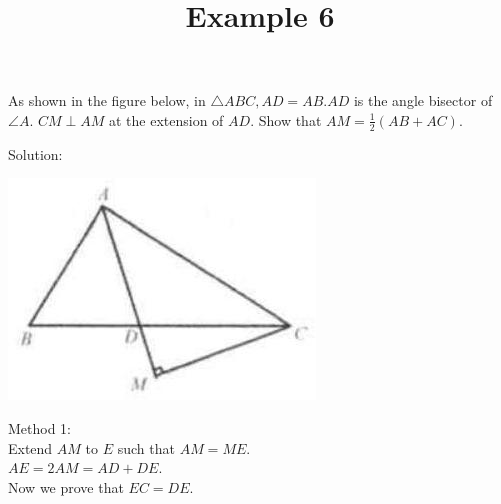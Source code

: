 \documentclass{article}
\title{Example 6}
\date{}
\begin{document}
\maketitle

As shown in the figure below, in \(\triangle A B C, A D=A B . A D\) is the angle bisector of \(\angle A\). \(C M \perp A M\) at the extension of \(A D\). Show that \(A M=\frac{1}{2}(A B+A C)\).

Solution:
\begin{center}
\includegraphics[width=\textwidth]{images/057(3).jpg}
\end{center}

Method 1:\\
Extend \(A M\) to \(E\) such that \(A M=M E\).\\
\(A E=2 A M=A D+D E\).\\
Now we prove that \(E C=D E\).
\end{document}
